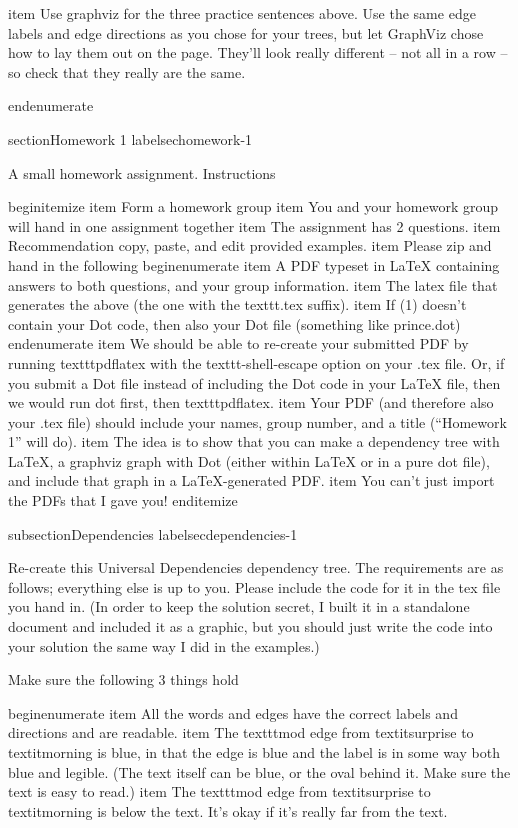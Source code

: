 item Use graphviz for the three practice sentences above. Use the same edge labels and edge directions as you chose for your trees, but let GraphViz chose how to lay them out on the page. They'll look really different -- not all in a row -- so check that they really are the same.


end{enumerate}



section{Homework 1}
label{sechomework-1}

A small homework assignment. Instructions

begin{itemize}
item Form a homework group
item You and your homework group will hand in one assignment together
item The assignment has 2 questions.
item Recommendation copy, paste, and edit provided examples.
item Please zip and hand in the following
  begin{enumerate}
  item A PDF typeset in LaTeX{} containing answers to both questions, and your group information.
  item The latex file that generates the above (the one with the texttt{.tex} suffix).
  item If (1) doesn't contain your Dot code, then also your Dot file (something like prince.dot)
  end{enumerate}
item We should be able to re-create your submitted PDF by running texttt{pdflatex} with the texttt{-shell-escape} option on your .tex file. Or, if you submit a Dot file instead of including the Dot code in your LaTeX{} file, then we would run dot first, then texttt{pdflatex}.
item Your PDF (and therefore also your .tex file) should include your names, group number, and a title (``Homework 1'' will do). 
item The idea is to show that you can make a dependency tree with LaTeX{}, a graphviz graph with Dot (either within LaTeX{} or in a pure dot file), and include that graph in a LaTeX{}-generated PDF.
item You can't just import the PDFs that I gave you!
end{itemize}

subsection{Dependencies}
label{secdependencies-1}

Re-create this Universal Dependencies dependency tree. The requirements are as follows; everything else is up to you. Please include the code for it in the tex file you hand in. (In order to keep the solution secret, I built it in a standalone document and included it as a graphic, but you should just write the code into your solution the same way I did in the examples.)

Make sure the following 3 things hold

begin{enumerate}
item All the words and edges have the correct labels and directions and are readable.
item The texttt{mod} edge from textit{surprise} to textit{morning} is blue, in that the edge is blue and the label is in some way both blue and legible. (The text itself can be blue, or the oval behind it. Make sure the text is easy to read.) 
item The texttt{mod} edge from textit{surprise} to textit{morning} is below the text. It's okay if it's really far from the text.


